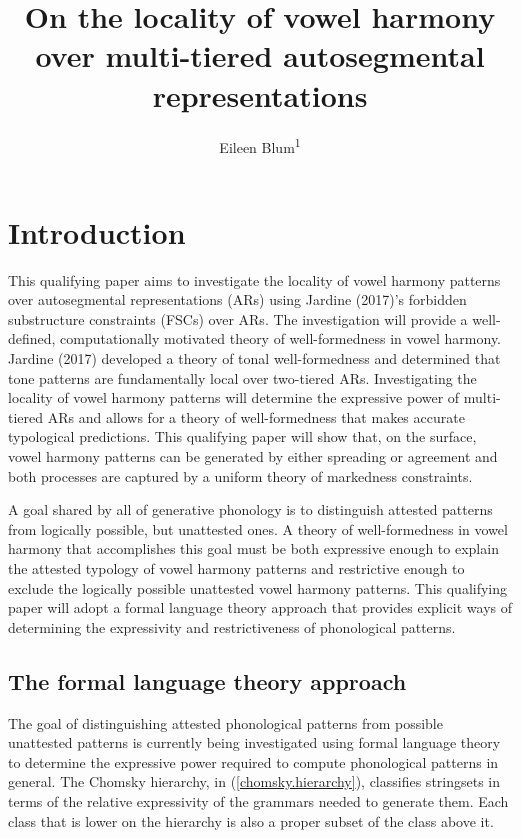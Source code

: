 \documentclass[,doc,floatsintext]{apa6}
\title{On the locality of vowel harmony over multi-tiered autosegmental
representations}
\author{Eileen Blum\textsuperscript{1}}
\date{}
\affiliation{
\vspace{0.5cm}
\textsuperscript{1} Rutgers University}
\theoremstyle{definition}
\theoremstyle{definition}
\theoremstyle{definition}
\theoremstyle{remark}
\begin{document}
\maketitle

\section{Introduction}\label{introduction}

This qualifying paper aims to investigate the locality of vowel harmony
patterns over autosegmental representations (ARs) using Jardine (2017)'s
forbidden substructure constraints (FSCs) over ARs. The investigation
will provide a well-defined, computationally motivated theory of
well-formedness in vowel harmony. Jardine (2017) developed a theory of
tonal well-formedness and determined that tone patterns are
fundamentally local over two-tiered ARs. Investigating the locality of
vowel harmony patterns will determine the expressive power of
multi-tiered ARs and allows for a theory of well-formedness that makes
accurate typological predictions. This qualifying paper will show that,
on the surface, vowel harmony patterns can be generated by either
spreading or agreement and both processes are captured by a uniform
theory of markedness constraints.

A goal shared by all of generative phonology is to distinguish attested
patterns from logically possible, but unattested ones. A theory of
well-formedness in vowel harmony that accomplishes this goal must be
both expressive enough to explain the attested typology of vowel harmony
patterns and restrictive enough to exclude the logically possible
unattested vowel harmony patterns. This qualifying paper will adopt a
formal language theory approach that provides explicit ways of
determining the expressivity and restrictiveness of phonological
patterns.

\subsection{The formal language theory
approach}\label{the-formal-language-theory-approach}

The goal of distinguishing attested phonological patterns from possible
unattested patterns is currently being investigated using formal
language theory to determine the expressive power required to compute
phonological patterns in general. The Chomsky hierarchy, in
(\ref{chomsky.hierarchy}), classifies stringsets in terms of the
relative expressivity of the grammars needed to generate them. Each
class that is lower on the hierarchy is also a proper subset of the
class above it.
\end{document}

